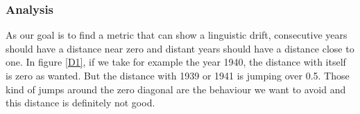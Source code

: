 \subsubsection{Analysis}

As our goal is to find a metric that can show a linguistic drift, consecutive years should have a distance near zero and distant years should have a distance close to one. In figure \ref{D1}, if we take for example the year 1940, the distance with itself is zero as wanted. But the distance with 1939 or 1941 is jumping over 0.5. Those kind of jumps around the zero diagonal are the behaviour we want to avoid and this distance is definitely not good.